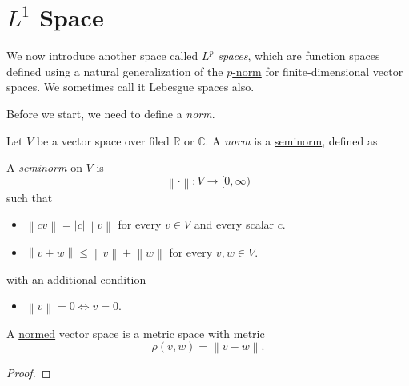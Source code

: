 \section{\(L^1\) Space}
We now introduce another space called \emph{\(L^p\) spaces}, which are function spaces defined using a natural generalization of the
\hyperref[eg:p-norm]{\(p\)-norm} for finite-dimensional vector spaces. We sometimes call it Lebesgue spaces also.

Before we start, we need to define a \emph{norm}.

\begin{definition}[Norm]\label{def:norm}
	Let \(V\) be a vector space over filed \(\mathbb{R} \) or \(\mathbb{C} \).
	A \emph{norm} is a \hyperref[def:seminorm]{seminorm}, defined as
	\begin{definition}[Seminorm]\label{def:seminorm}
		A \emph{seminorm} on \(V\) is
		\[
			\left\lVert \cdot\right\rVert \colon V\to [0, \infty )
		\]
		such that
		\begin{itemize}
			\item \(\left\lVert c v\right\rVert =\left\vert c \right\vert \left\lVert v\right\rVert \) for every \(v\in V\) and every scalar \(c\).
			\item \(\left\lVert  v+w\right\rVert \leq \left\lVert v\right\rVert +\left\lVert w\right\rVert \) for every \(v, w\in V\).
		\end{itemize}
	\end{definition}
	with an additional condition
	\begin{itemize}
		\item \(\left\lVert v\right\rVert = 0 \iff v = 0\).
	\end{itemize}
\end{definition}

\begin{lemma}
	A \hyperref[def:norm]{normed} vector space is a metric space with metric
	\[
		\rho (v, w) = \left\lVert v - w\right\rVert.
	\]
\end{lemma}
\begin{proof}
\end{proof}

